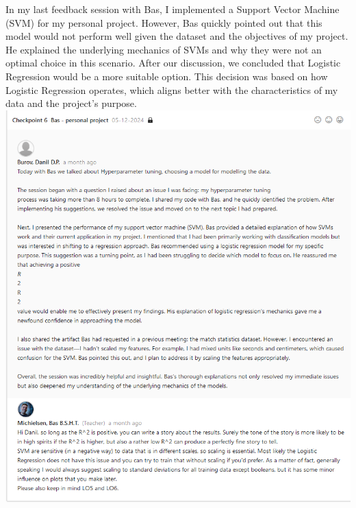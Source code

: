 \documentclass{article}
\begin{document}
	In my last feedback session with Bas, I implemented a Support Vector Machine (SVM) for my personal project. However, Bas quickly pointed out that this model would not perform well given the dataset and the objectives of my project. He explained the underlying mechanics of SVMs and why they were not an optimal choice in this scenario. After our discussion, we concluded that Logistic Regression would be a more suitable option. This decision was based on how Logistic Regression operates, which aligns better with the characteristics of my data and the project's purpose.\\
	\includegraphics[width=\textwidth]{images/Feedback_Bas_2.png}\\
	
\end{document}
